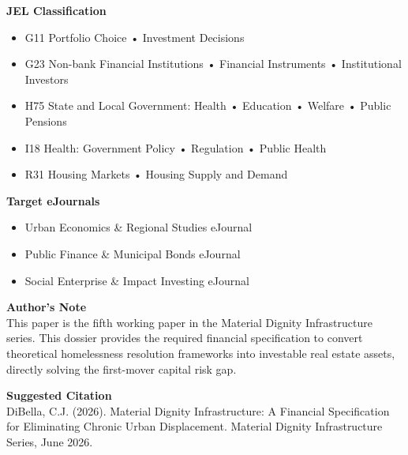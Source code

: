 \documentclass[12pt, letterpaper]{article}
\begin{document}
\vspace{8pt}
\noindent\textbf{JEL Classification}
\begin{itemize}[nosep, before={\vspace{-8pt}}, leftmargin=2em]
    \item G11 Portfolio Choice • Investment Decisions
    \item G23 Non-bank Financial Institutions • Financial Instruments • Institutional Investors
    \item H75 State and Local Government: Health • Education • Welfare • Public Pensions
    \item I18 Health: Government Policy • Regulation • Public Health
    \item R31 Housing Markets • Housing Supply and Demand
\end{itemize}

\vspace{8pt}
\noindent\textbf{Target eJournals}
\begin{itemize}[nosep, before={\vspace{-8pt}}, leftmargin=2em]
    \item Urban Economics \& Regional Studies eJournal
    \item Public Finance \& Municipal Bonds eJournal
    \item Social Enterprise \& Impact Investing eJournal
\end{itemize}

\vspace{8pt}
\noindent\textbf{Author's Note}\\[1pt]
This paper is the fifth working paper in the Material Dignity Infrastructure series. This dossier provides the required financial specification to convert theoretical homelessness resolution frameworks into investable real estate assets, directly solving the first-mover capital risk gap.

\vspace{8pt}
\noindent\textbf{Suggested Citation}\\[1pt]
DiBella, C.J. (2026). Material Dignity Infrastructure: A Financial Specification for Eliminating Chronic Urban Displacement. Material Dignity Infrastructure Series, June 2026.

\vspace{12pt}
\begingroup
{}
\setlength{\cftbeforesecskip}{2pt}
\setlength{\cftbeforesubsecskip}{-2pt}
\tableofcontents
\endgroup
\end{document}
